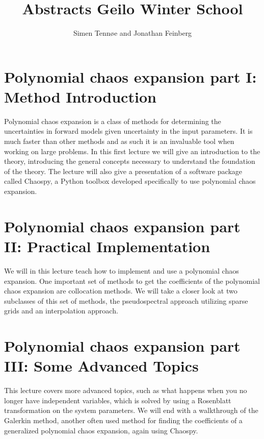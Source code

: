 \documentclass[a4paper,10pt]{article}
\title{Abstracts Geilo Winter School}
\author{Simen Tennøe and Jonathan Feinberg}
\begin{document}
\maketitle
\newpage


\section{Polynomial chaos expansion part I: Method Introduction}
Polynomial chaos expansion is a class of methods for determining the
uncertainties in forward models given uncertainty in the input parameters.
It is much faster than other methods and as such it is an invaluable tool when working on large problems.
In this first lecture we will give an introduction to the theory, introducing the 
general concepts necessary to understand the foundation of the theory.
The lecture will also give a presentation of a software
package called Chaospy, a Python toolbox developed specifically to
use polynomial chaos expansion.



\section{Polynomial chaos expansion part II: Practical Implementation}
We will in this lecture teach how to implement and use a polynomial chaos expansion.
One important set of methods to get the coefficients of the
polynomial chaos expansion are collocation methods.
We will take a closer look at two subclasses of this set of
methods, the pseudospectral approach utilizing sparse grids and an
interpolation approach. 




\section{Polynomial chaos expansion part III: Some Advanced Topics}
This lecture covers more advanced topics, such as what happens when
you no longer have independent variables,
which is solved by using a Rosenblatt transformation on the
system parameters.
We will end with a walkthrough of the Galerkin method, another
often used method for finding the coefficients of a generalized
polynomial chaos expansion, again using Chaospy.
\end{document}
